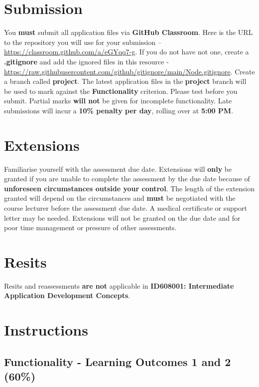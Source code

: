 \documentclass{article}
\begin{document}
\section*{Submission}
You \textbf{must} submit all application files via \textbf{GitHub Classroom}. Here is the URL to the repository you will use for your submission – \href{https://classroom.github.com/a/eGYqq7-g}{https://classroom.github.com/a/eGYqq7-g}. If you do not have not one, create a \textbf{.gitignore} and add the ignored files in this resource - \href{https://raw.githubusercontent.com/github/gitignore/main/Node.gitignore}{https://raw.githubusercontent.com/github/gitignore/main/Node.gitignore}. Create a branch called \textbf{project}. The latest application files in the \textbf{project} branch will be used to mark against the \textbf{Functionality} criterion. Please test before you submit. Partial marks \textbf{will not} be given for incomplete functionality. Late submissions will incur a \textbf{10\% penalty per day}, rolling over at \textbf{5:00 PM}.\\

\section*{Extensions}
Familiarise yourself with the assessment due date. Extensions will \textbf{only} be granted if you are unable to complete the assessment by the due date because of \textbf{unforeseen circumstances outside your control}. The length of the extension granted will depend on the circumstances and \textbf{must} be negotiated with the course lecturer before the assessment due date. A medical certificate or support letter may be needed. Extensions will not be granted on the due date and for poor time management or pressure of other assessments.

\section*{Resits}
Resits and reassessments \textbf{are not} applicable in \textbf{ID608001: Intermediate Application Development Concepts}.

\section*{Instructions}

\subsection*{Functionality - Learning Outcomes 1 and 2 (60\%)}
\end{document}
